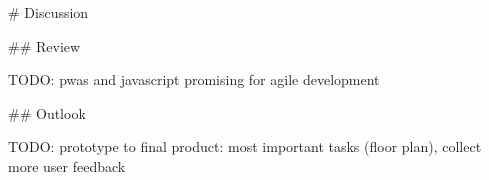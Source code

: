 \begin{markdown}

# Discussion

## Review

TODO: pwas and javascript promising for agile development

## Outlook

TODO: prototype to final product: most important tasks (floor plan), collect more user feedback

\end{markdown}
